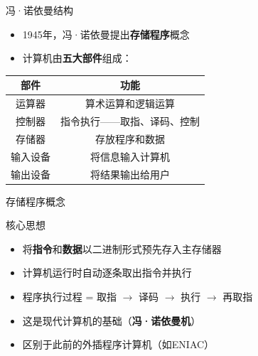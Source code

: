\documentclass[10pt, aspectratio=169]{beamer}
\begin{document}
\begin{frame}{冯·诺依曼结构}
    \begin{itemize}
        \item 1945年，冯·诺依曼提出\textbf{存储程序}概念
        \item 计算机由\textbf{五大部件}组成：
    \end{itemize}
    \vspace{0.5em}
    \begin{center}
        \begin{tabular}{|c|c|}
            \hline
            \textbf{部件} & \textbf{功能} \\
            \hline
            运算器 & 算术运算和逻辑运算 \\
            \hline
            控制器 & 指令执行——取指、译码、控制 \\
            \hline
            存储器 & 存放程序和数据 \\
            \hline
            输入设备 & 将信息输入计算机 \\
            \hline
            输出设备 & 将结果输出给用户 \\
            \hline
        \end{tabular}
    \end{center}
\end{frame}

\begin{frame}{存储程序概念}
    \begin{block}{核心思想}
        \begin{itemize}
            \item 将\textbf{指令}和\textbf{数据}以二进制形式预先存入主存储器
            \item 计算机运行时自动逐条取出指令并执行
            \item 程序执行过程 = 取指 $\rightarrow$ 译码 $\rightarrow$ 执行 $\rightarrow$ 再取指
        \end{itemize}
    \end{block}
    \vspace{0.5em}
    \begin{itemize}
        \item 这是现代计算机的基础（\textbf{冯·诺依曼机}）
        \item 区别于此前的外插程序计算机（如ENIAC）
    \end{itemize}
\end{frame}
\end{document}

